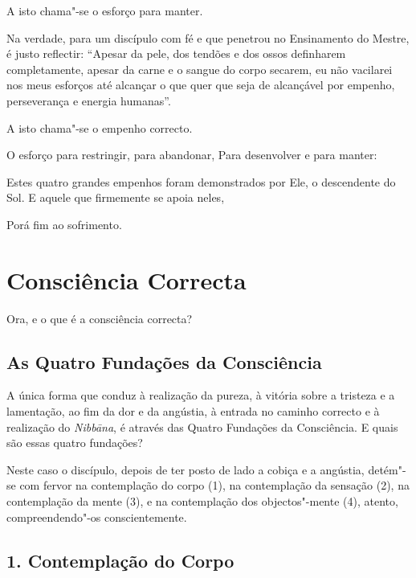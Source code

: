 A isto chama"-se o esforço para manter.


Na verdade, para um discípulo com fé e que penetrou no Ensinamento do Mestre, é
justo reflectir: “Apesar da pele, dos tendões e dos ossos definharem
completamente, apesar da carne e o sangue do corpo secarem, eu não vacilarei nos
meus esforços até alcançar o que quer que seja de alcançável por empenho,
perseverança e energia humanas”.

A isto chama"-se o empenho correcto.


O esforço para restringir, para abandonar, Para desenvolver e para manter:

Estes quatro grandes empenhos foram demonstrados por Ele, o descendente do Sol.
E aquele que firmemente se apoia neles,

Porá fim ao sofrimento.


\section{Consciência Correcta}



Ora, e o que é a consciência correcta?

\subsection{As Quatro Fundações da Consciência}


A única forma que conduz à realização da pureza, à vitória sobre a tristeza e a
lamentação, ao fim da dor e da angústia, à entrada no caminho correcto e à
realização do \emph{Nibbāna}, é através das Quatro Fundações da Consciência. E
quais são essas quatro fundações?

Neste caso o discípulo, depois de ter posto de lado a cobiça e a angústia,
detém"-se com fervor na contemplação do corpo (1), na contemplação da sensação
(2), na contemplação da mente (3), e na contemplação dos objectos"-mente (4),
atento, compreendendo"-os conscientemente.

\subsection{1. Contemplação do Corpo}

